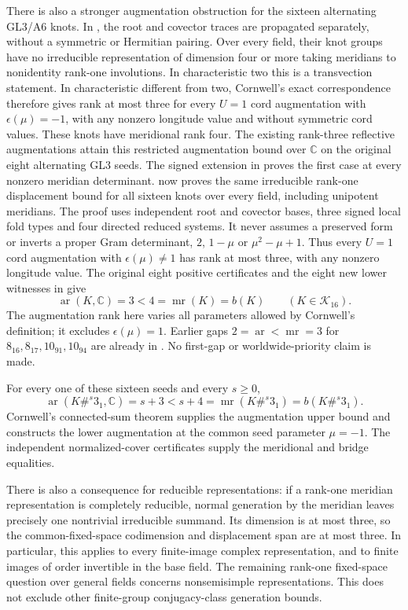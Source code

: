 \documentclass[11pt]{article}
\newcommand{\mr}{\operatorname{mr}}
\begin{document}
There is also a stronger augmentation obstruction for the sixteen
alternating GL3/A6 knots. In
, the root and covector traces
are propagated separately, without a symmetric or Hermitian pairing.
Over every field, their knot groups have no irreducible representation
of dimension four or more taking meridians to nonidentity rank-one
involutions. In characteristic two this is a transvection statement.
In characteristic different from two, Cornwell's exact correspondence
\cite[Theorem1.2, Definition1.8 and Proposition2.12]{cornwell17}
therefore gives rank at most three for every $U=1$ cord augmentation
with $\epsilon(\mu)=-1$, with any nonzero longitude value and without
symmetric cord values. These knots have meridional rank four. The existing rank-three
reflective augmentations attain this restricted augmentation bound
over $\mathbb C$ on the original eight alternating GL3 seeds.
The signed extension in  proves
the first case at every nonzero meridian determinant.
 now proves the same irreducible
rank-one displacement bound for all sixteen knots over every field,
including unipotent meridians. The proof uses independent root and
covector bases, three signed local fold types and four directed reduced
systems. It never assumes a preserved form or inverts a proper Gram
determinant, $2$, $1-\mu$ or $\mu^2-\mu+1$.
Thus every $U=1$ cord augmentation with $\epsilon(\mu)\ne1$ has rank
at most three, with any nonzero longitude value. The original eight
positive certificates and the eight new lower witnesses in
 give
\[
 \operatorname{ar}(K,\mathbb C)=3<4=\mr(K)=b(K)
 \qquad(K\in\mathcal K_{16}).
\]
The augmentation rank here varies all parameters allowed by Cornwell's
definition; it excludes $\epsilon(\mu)=1$. Earlier gaps
$2=\operatorname{ar}<\mr=3$ for $8_{16},8_{17},10_{91},10_{94}$ are
already in \cite[Corollary1.12 and Theorem5.3]{cornwell17}.
No first-gap or worldwide-priority claim is made.

For every one of these sixteen seeds and every $s\ge0$,
\[
 \operatorname{ar}(K\#^s3_1,\mathbb C)=s+3
 <s+4=\mr(K\#^s3_1)=b(K\#^s3_1).
\]
Cornwell's connected-sum theorem
\cite[Theorem1.9, Section4.2]{cornwell17} supplies the augmentation
upper bound and constructs the lower augmentation at the common seed
parameter $\mu=-1$. The independent normalized-cover certificates
supply the meridional and bridge equalities.

There is also a consequence for reducible representations: if a
rank-one meridian representation is completely reducible, normal
generation by the meridian leaves precisely one nontrivial irreducible
summand. Its dimension is at most three, so the common-fixed-space
codimension and displacement span are at most three. In particular,
this applies to every finite-image complex representation, and to
finite images of order invertible in the base field. The remaining
rank-one fixed-space question over general fields concerns
nonsemisimple representations. This does not exclude other finite-group
conjugacy-class generation bounds.
\end{document}
